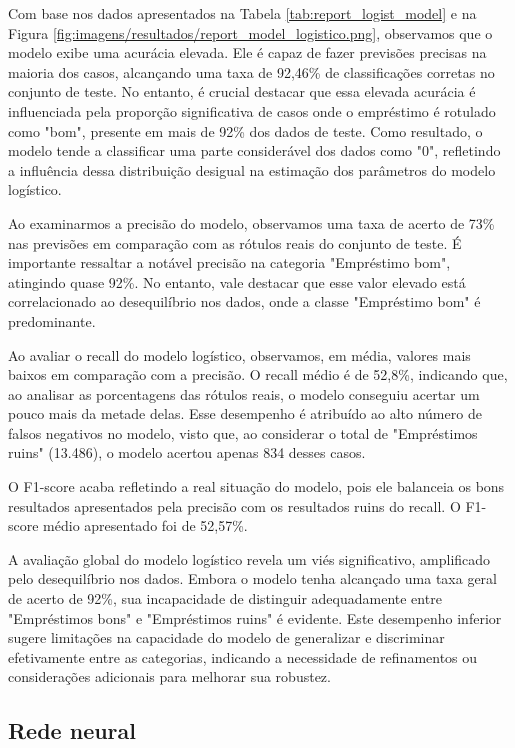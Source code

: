 Com base nos dados apresentados na Tabela \ref{tab:report_logist_model}
e na Figura \ref{fig:imagens/resultados/report_model_logistico.png},
observamos que o modelo exibe uma acurácia elevada. Ele é capaz de fazer 
previsões precisas na maioria dos casos, alcançando uma taxa de 92,46\% 
de classificações corretas no conjunto de teste. No entanto, 
é crucial destacar que essa elevada acurácia é influenciada pela proporção
significativa de casos onde o empréstimo é rotulado como "bom", presente 
em mais de 92\% dos dados de teste. Como resultado, o modelo tende a
classificar uma parte considerável dos dados como "0", refletindo a
influência dessa distribuição desigual na estimação dos parâmetros do modelo logístico. 


Ao examinarmos a precisão do modelo, observamos uma taxa de acerto de 73\%
nas previsões em comparação com as rótulos reais do conjunto de teste. 
É importante ressaltar a notável precisão na categoria "Empréstimo bom", atingindo quase 92\%. 
No entanto, vale destacar que esse valor elevado está correlacionado ao desequilíbrio nos dados,
onde a classe "Empréstimo bom" é predominante.

Ao avaliar o recall do modelo logístico, observamos, em média,
valores mais baixos em comparação com a precisão. O recall médio é de 52,8\%, 
indicando que, ao analisar as porcentagens das rótulos reais, o modelo conseguiu 
acertar um pouco mais da metade delas. Esse desempenho é atribuído ao alto número 
de falsos negativos no modelo, visto que, ao considerar o total de "Empréstimos ruins" (13.486),
 o modelo acertou apenas 834 desses casos.

O F1-score acaba refletindo a real situação do modelo, pois ele balanceia os bons resultados
apresentados pela precisão com os resultados ruins do recall. O F1-score médio apresentado foi
de 52,57\%.

A avaliação global do modelo logístico revela um viés significativo, amplificado pelo desequilíbrio nos dados.
Embora o modelo tenha alcançado uma taxa geral de acerto de 92\%, sua incapacidade de distinguir
adequadamente entre "Empréstimos bons" e "Empréstimos ruins" é evidente. 
Este desempenho inferior sugere limitações na capacidade do modelo de generalizar e
discriminar efetivamente entre as categorias, indicando a necessidade de refinamentos ou 
considerações adicionais para melhorar sua robustez.


\subsection{Rede neural}

